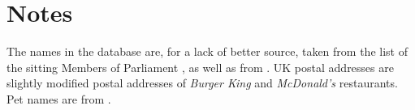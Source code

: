 \documentclass[10pt]{article}
\begin{document}
\section{Notes}
\thispagestyle{fancy}

The names in the database are, for a lack of better source, taken from the list of the sitting Members of Parliament \cite{mps}, as well as from \cite{minarcsys}.  UK postal addresses are slightly modified postal addresses of {\em Burger King} \cite{burgerking} and {\em McDonald's} \cite{mcdonalds} restaurants.  Pet names are from \cite{petnames}.


\pagebreak

\thispagestyle{fancy}
\end{document}
